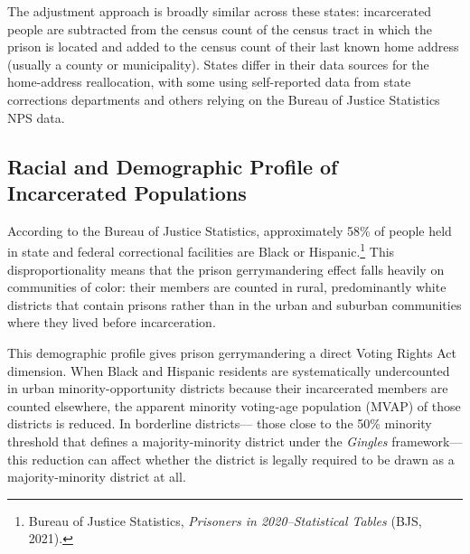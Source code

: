 The adjustment approach is broadly similar across these states:
incarcerated people are subtracted from the census count of the census
tract in which the prison is located and added to the census count of
their last known home address (usually a county or municipality).
States differ in their data sources for the home-address reallocation,
with some using self-reported data from state corrections departments
and others relying on the Bureau of Justice Statistics NPS data.

\subsection{Racial and Demographic Profile of Incarcerated Populations}

According to the Bureau of Justice Statistics, approximately 58\% of
people held in state and federal correctional facilities are Black or
Hispanic.\footnote{Bureau of Justice Statistics, \textit{Prisoners in
2020--Statistical Tables} (BJS, 2021).} This disproportionality
means that the prison gerrymandering effect falls heavily on communities
of color: their members are counted in rural, predominantly white districts
that contain prisons rather than in the urban and suburban communities
where they lived before incarceration.

This demographic profile gives prison gerrymandering a direct Voting Rights
Act dimension. When Black and Hispanic residents are systematically
undercounted in urban minority-opportunity districts because their
incarcerated members are counted elsewhere, the apparent minority voting-age
population (MVAP) of those districts is reduced. In borderline districts---
those close to the 50\% minority threshold that defines a majority-minority
district under the \textit{Gingles} framework---this reduction can affect
whether the district is legally required to be drawn as a majority-minority
district at all.
